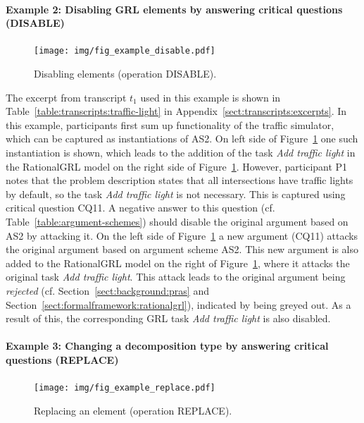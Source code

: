 \paragraph{Example 2: Disabling GRL elements by answering critical questions (\textsf{DISABLE)}}

\begin{figure}[b]
\centering
\texttt{[image: img/fig\_example\_disable.pdf]}
\caption{Disabling elements (operation \textsf{DISABLE)}.}
\label{fig:example_disable}
\end{figure}

The excerpt from transcript $t_1$ used in this example is shown in Table~\ref{table:transcripts:traffic-light} in Appendix~\ref{sect:transcripts:excerpts}. In this example, participants first sum up functionality of the traffic simulator, which can be captured as instantiations of AS2. On left side of Figure~\ref{fig:example_disable} one such instantiation is shown, which leads to the addition of the task \emph{Add traffic light} in the RationalGRL model on the right side of Figure~\ref{fig:example_disable}. However, participant P1 notes that the problem description states that all intersections have traffic lights by default, so the task \emph{Add traffic light} is not necessary. This is captured using critical question CQ11. A negative answer to this question (cf. Table~\ref{table:argument-schemes}) should disable the original argument based on AS2 by attacking it. On the left side of Figure~\ref{fig:example_disable} a new argument (CQ11) attacks the original argument based on argument scheme AS2. This new argument is also added to the RationalGRL model on the right of Figure~\ref{fig:example_disable}, where it attacks the original task \emph{Add traffic light}. This attack leads to the original argument being \emph{rejected} (cf. Section~\ref{sect:background:pras} and Section~\ref{sect:formalframework:rationalgrl}), indicated by being greyed out. As a result of this, the corresponding GRL task \emph{Add traffic light} is also disabled. 

\paragraph{Example 3: Changing a decomposition type by answering critical questions (\textsf{REPLACE})} 

\begin{figure}[t]
\centering
\texttt{[image: img/fig\_example\_replace.pdf]}
\caption{Replacing an element (operation \textsf{REPLACE)}.}
\label{fig:examples:replace}
\end{figure}

